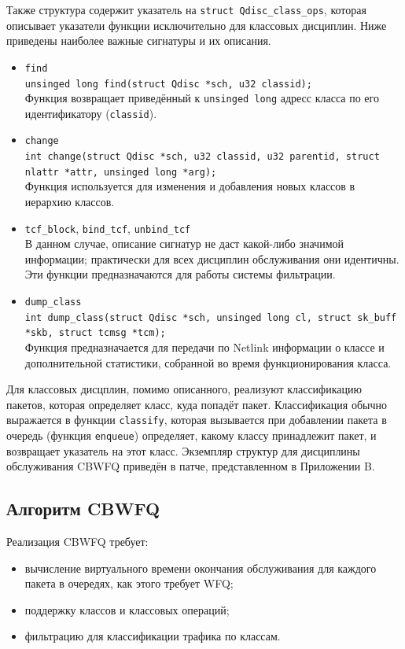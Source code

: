 	Также структура содержит указатель на \lstinline{struct Qdisc_class_ops},
	которая описывает указатели функции исключительно для классовых дисциплин.
	Ниже приведены наиболее важные сигнатуры и их описания.\cite{linuxsrc}
	\begin{itemize}
		\item \lstinline{find}\\
			\lstinline{unsinged long find(struct Qdisc *sch, u32 classid);}\\
			Функция возвращает приведённый к \lstinline{unsinged long} адресс класса по его идентификатору (\lstinline{classid}).
		\item \lstinline{change} \\
			\lstinline{int change(struct Qdisc *sch, u32 classid, u32 parentid, struct nlattr *attr, unsinged long *arg);}\\
			Функция используется для изменения и добавления новых классов в иерархию классов. 
		\item \lstinline{tcf_block}, \lstinline{bind_tcf}, \lstinline{unbind_tcf}\\
			В данном случае, описание сигнатур не даст какой-либо значимой информации; практически
			для всех дисциплин обслуживания они идентичны. Эти функции предназначаются для работы
			системы фильтрации.
		\item \lstinline{dump_class}\\
			\lstinline{int dump_class(struct Qdisc *sch, unsinged long cl, struct sk_buff *skb, struct tcmsg *tcm);} \\
			Функция предназначается для передачи по Netlink информации о классе и дополнительной статистики, собранной
			во время функционирования класса.
	\end{itemize}

	Для классовых дисцплин, помимо описанного, реализуют классификацию пакетов, которая
	определяет класс, куда попадёт пакет. Классификация обычно выражается в функции \lstinline{classify},
	которая вызывается при добавлении пакета в очередь (функция \lstinline{enqueue}) определяет, какому классу
	 принадлежит пакет, и возвращает указатель на этот класс.
	Экземпляр структур для дисциплины обслуживания CBWFQ приведён в патче, представленном в Приложении B.

	\subsection{Алгоритм CBWFQ}

		Реализация CBWFQ требует:
		\begin{itemize}
			\item вычисление виртуального времени окончания обслуживания для каждого
				   пакета в очередях, как этого требует WFQ;
			\item поддержку классов и классовых операций;
			\item фильтрацию для классификации трафика по классам.
		\end{itemize}

